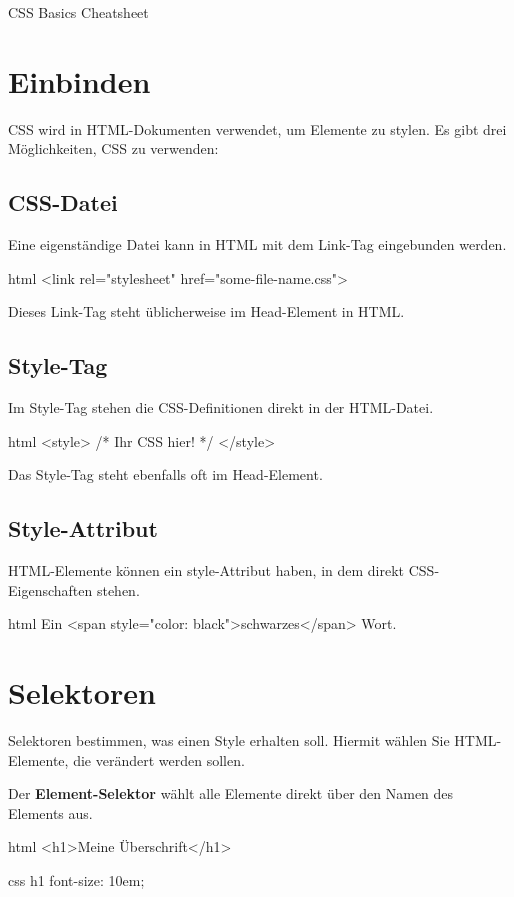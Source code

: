 \documentclass[10pt,a4paper]{article}
\begin{document}
\thispagestyle{empty}

{\color{accentcolor}CSS Basics Cheatsheet}

\begin{multicols}{3}

\scriptsize

\section*{Einbinden}
CSS wird in HTML-Dokumenten verwendet, um Elemente zu stylen. Es gibt drei Möglichkeiten, CSS zu verwenden:

\subsection*{CSS-Datei}
Eine eigenständige Datei kann in HTML mit dem Link-Tag eingebunden werden.
\begin{codebox}{html}{}
<link rel="stylesheet" href="some-file-name.css">
\end{codebox}
Dieses Link-Tag steht üblicherweise im Head-Element in HTML.

\subsection*{Style-Tag}
Im Style-Tag stehen die CSS-Definitionen direkt in der HTML-Datei.
\begin{codebox}{html}{}
<style>
/* Ihr CSS hier! */
</style>
\end{codebox}
Das Style-Tag steht ebenfalls oft im Head-Element.

\subsection*{Style-Attribut}
HTML-Elemente können ein style-Attribut haben, in dem direkt CSS-Eigenschaften stehen.
\begin{codebox}{html}{}
Ein <span style="color: black">schwarzes</span> Wort.
\end{codebox}

\section*{Selektoren}
Selektoren bestimmen, was einen Style erhalten soll. Hiermit wählen Sie HTML-Elemente, die verändert werden sollen.


Der \textbf{Element-Selektor} wählt alle Elemente direkt über den Namen des Elements aus.
\begin{codebox}{html}{}
<h1>Meine Überschrift</h1>
\end{codebox}
\begin{codebox}{css}{}
h1 {
  font-size: 10em;
}
\end{codebox}


\end{multicols}
\end{document}
